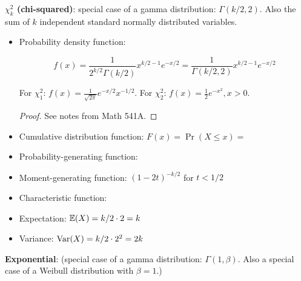 \textbf{\(\chi_k^2\) (chi-squared)}: special case of a gamma distribution: \(\Gamma(k/2, 2)\). Also the sum of \(k\) independent standard normally distributed variables.

\begin{itemize}

\item Probability density function: 

\[
f(x)  = \frac{1}{2^{k/2}\Gamma(k/2)} x^{k/2 - 1} e^{-x/2} = \frac{1}{\Gamma(k/2, 2)} x^{k/2 - 1} e^{-x/2}
\]

For \(\chi_1^2\): \(f(x) = \frac{1}{\sqrt{2\pi}} e^{-x/2}x^{-1/2} \). For \(\chi_2^2\): \(f(x) = \frac{1}{2}e^{-x^2}, x > 0\). 

\begin{proof} See notes from Math 541A. \end{proof}

\item Cumulative distribution function: \(F(x) = \Pr(X \leq x) = \)

\item Probability-generating function:

\item Moment-generating function: \((1-2t)^{-k/2}\) for \(t < 1/2\)

\item Characteristic function:

\item Expectation: \(\mathbb{E}(X) = k/2 \cdot 2 = k \)

\item Variance: \(\mathrm{Var}(X) = k/2 \cdot 2^2 = 2k\)

\end{itemize}


\textbf{Exponential}: \label{prob.exp} (special case of a gamma distribution: \(\Gamma(1, \beta)\). Also a special case of a Weibull distribution with \(\beta = 1\).)

